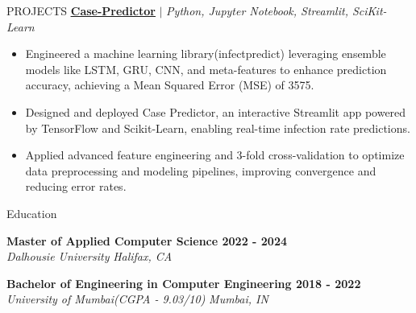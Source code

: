 \documentclass{resume} %
\begin{document}
\begin{rSection}{PROJECTS}
\href{https://github.com/RutvikJ77/Case-Predictor}
{\textbf{\underline{Case-Predictor}}} $|$\textit{ Python, Jupyter Notebook, Streamlit, SciKit-Learn}
\begin{itemize}
  \item Engineered a machine learning library(infectpredict) leveraging ensemble models like LSTM, GRU, CNN, and meta-features to enhance prediction accuracy, achieving a Mean Squared Error (MSE) of 3575.
  \item {Designed and deployed Case Predictor, an interactive Streamlit app powered by TensorFlow and Scikit-Learn, enabling real-time infection rate predictions.}
  \item {Applied advanced feature engineering and 3-fold cross-validation to optimize data preprocessing and modeling pipelines, improving convergence and reducing error rates.}
\end{itemize}


\end{rSection} 


\begin{rSection}{Education}

{\bf Master of Applied Computer Science \hfill {2022 - 2024}}\\
\textit{Dalhousie University} \hfill{\textit{Halifax, CA}}

{\bf Bachelor of Engineering in Computer Engineering \hfill {2018 - 2022}}\\
\textit{University of Mumbai(CGPA - 9.03/10)} \hfill{\textit{Mumbai, IN}}


\end{rSection}
\end{document}
